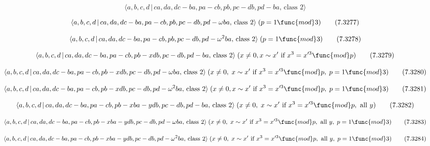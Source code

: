 \documentclass[10pt]{article}
\begin{document}
\begin{equation}
\langle a,b,c,d\,|\,ca,da,dc-ba,pa-cb,pb,pc-db,pd-ba,\,\text{class }2\rangle
\tag{7.3276}
\end{equation}

\begin{equation}
\langle a,b,c,d\,|\,ca,da,dc-ba,pa-cb,pb,pc-db,pd-\omega ba,\,\text{class }%
2\rangle \;(p=1\func{mod}3)  \tag{7.3277}
\end{equation}

\begin{equation}
\langle a,b,c,d\,|\,ca,da,dc-ba,pa-cb,pb,pc-db,pd-\omega ^{2}ba,\,\text{%
class }2\rangle \;(p=1\func{mod}3)  \tag{7.3278}
\end{equation}

\begin{equation}
\langle a,b,c,d\,|\,ca,da,dc-ba,pa-cb,pb-xdb,pc-db,pd-ba,\,\text{class }%
2\rangle \;(x \neq 0, x \sim x^{\prime }\text{ if }x^3=x^{\prime 3 }\func{mod%
} p)  \tag{7.3279}
\end{equation}

\begin{equation}
\langle a,b,c,d\,|\,ca,da,dc-ba,pa-cb,pb-xdb,pc-db,pd-\omega ba,\,\text{%
class }2\rangle \;(x\neq 0,\;x\sim x^{\prime }\text{ if }x^{3}=x^{\prime 3}%
\func{mod}p,\;p=1\func{mod}3)  \tag{7.3280}
\end{equation}

\begin{equation}
\langle a,b,c,d\,|\,ca,da,dc-ba,pa-cb,pb-xdb,pc-db,pd-\omega ^{2}ba,\,\text{%
class }2\rangle \;(x\neq 0,x \sim x^{\prime }\text{ if }x^3=x^{\prime 3}%
\func{mod}p,\;p=1\func{mod}3)  \tag{7.3281}
\end{equation}

\begin{equation}
\langle a,b,c,d\,|\,ca,da,dc-ba,pa-cb,pb-xba-ydb,pc-db,pd-ba,\,\text{class }%
2\rangle \;(x\neq 0,\;x\sim x^{\prime }\text{ if }x^{3}=x^{\prime 3}\func{mod%
}p,\text{ all }y)  \tag{7.3282}
\end{equation}

\begin{equation}
\langle a,b,c,d\,|\,ca,da,dc-ba,pa-cb,pb-xba-ydb,pc-db,pd-\omega ba,\,\text{%
class }2\rangle \;(x\neq 0,\;x\sim x^{\prime }\text{ if }x^{3}=x^{\prime 3}%
\func{mod}p,\text{ all }y,\;p=1\func{mod}3)  \tag{7.3283}
\end{equation}

\begin{equation}
\langle a,b,c,d\,|\,ca,da,dc-ba,pa-cb,pb-xba-ydb,pc-db,pd-\omega ^{2}ba,\,%
\text{class }2\rangle \;(x\neq 0,\;x\sim x^{\prime }\text{ if }%
x^{3}=x^{\prime 3}\func{mod}p,\text{ all }y,\;p=1\func{mod}3)  \tag{7.3284}
\end{equation}
\end{document}
